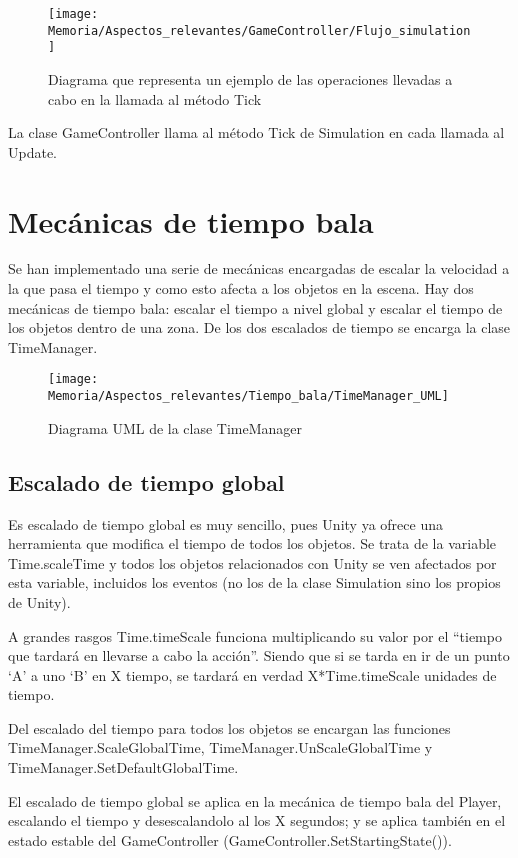 \clearpage
\begin{figure}[h]
\texttt{[image: Memoria/Aspectos\_relevantes/GameController/Flujo\_simulation]}
\caption{Diagrama que representa un ejemplo de las operaciones llevadas a cabo en la llamada al método Tick}
\end{figure}

La clase GameController llama al método Tick de Simulation en cada llamada al Update.

\section{Mecánicas de tiempo bala}
Se han implementado una serie de mecánicas encargadas de escalar la velocidad a la que pasa el tiempo y como esto afecta a los objetos en la escena. Hay dos mecánicas de tiempo bala: escalar el tiempo a nivel global y escalar el tiempo de los objetos dentro de una zona. De los dos escalados de tiempo se encarga la clase TimeManager.

\clearpage
\begin{figure}[h]
\texttt{[image: Memoria/Aspectos\_relevantes/Tiempo\_bala/TimeManager\_UML]}
\caption{Diagrama UML de la clase TimeManager}
\end{figure}

\subsection{Escalado de tiempo global}
Es escalado de tiempo global es muy sencillo, pues Unity ya ofrece una herramienta que modifica el tiempo de todos los objetos. Se trata de la variable Time.scaleTime y todos los objetos relacionados con Unity se ven afectados por esta variable, incluidos los eventos (no los de la clase Simulation sino los propios de Unity).

A grandes rasgos Time.timeScale funciona multiplicando su valor por el “tiempo que tardará en llevarse a cabo la acción”. Siendo que si se tarda en ir de un punto ‘A’ a uno ‘B’ en X tiempo, se tardará en verdad X*Time.timeScale unidades de tiempo.

Del escalado del tiempo para todos los objetos se encargan las funciones TimeManager.ScaleGlobalTime, TimeManager.UnScaleGlobalTime y TimeManager.SetDefaultGlobalTime.

El escalado de tiempo global se aplica en la mecánica de tiempo bala del Player, escalando el tiempo y desescalandolo al los X segundos; y se aplica también en el estado estable del GameController (GameController.SetStartingState()).

